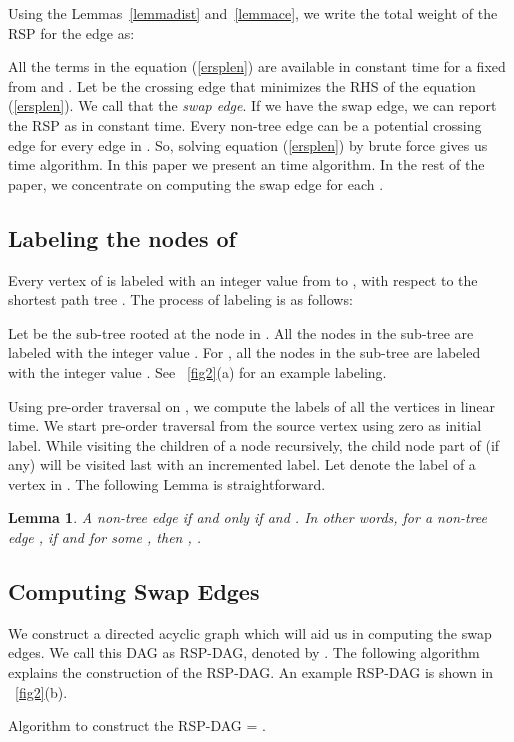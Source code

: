 \documentclass[11pt,a4paper]{llncs}
\newtheorem{lem}[thm]{Lemma}
\begin{document}
Using the Lemmas~\ref{lemmadist} and~\ref{lemmace}, we write the total weight of the RSP for
the edge 
as:


All the terms in the equation (\ref{ersplen}) are available in constant time
for a fixed  from  and . Let  be the crossing edge that minimizes
the RHS of the equation (\ref{ersplen}). We call that  the \emph{swap edge}. If we have the swap edge, we can report
the RSP as  in constant time. Every non-tree edge can be a potential crossing edge for every edge in . So, solving equation (\ref{ersplen}) by brute force gives us  time algorithm. In this paper we present an  time algorithm.
In the rest of the paper, we concentrate on computing the swap edge for each .
\subsection{Labeling the nodes of }
\label{labeling}
Every vertex of  is labeled with an integer value from  to , with
respect to the shortest path tree . The process of labeling is as follows:

Let  be the sub-tree rooted at the node  in .
All the nodes in the sub-tree  are labeled with the integer value .
For , all the nodes in the sub-tree 
are labeled with the integer value . See \figurename~\ref{fig2}(a) for an example labeling.

Using pre-order traversal on , we compute the labels of all the vertices in linear time.
We start pre-order traversal from the source vertex  using zero as initial label.
While visiting the children of a node recursively, the child node part of  (if any)
will be visited last with an incremented label.
Let  denote the label of a vertex  in . The following Lemma is straightforward.

\begin{lem}
\label{lemmalabel1}
A non-tree edge  if and only if  and .
In other words, for a non-tree edge , if  and 
for some , then , .
\end{lem}
\subsection{Computing Swap Edges}
We construct a directed acyclic graph which will aid us in computing the swap edges.
We call this DAG as RSP-DAG, denoted by .
The following algorithm explains the construction of the RSP-DAG.
An example RSP-DAG is shown in \figurename~\ref{fig2}(b).

\begin{algorithm}[H]
    \caption{Algorithm to construct the RSP-DAG  = .}
    \label{rspdag}
    \begin{algorithmic}[1]
    \STATE 
    \STATE 
    \FOR{}
        \FOR{}
           \STATE 
        \ENDFOR
    \ENDFOR
    \FORALL{ }
        \IF{}
            \STATE 
            \STATE 
        \ENDIF
    \ENDFOR
    \end{algorithmic}
\end{algorithm}
\end{document}
